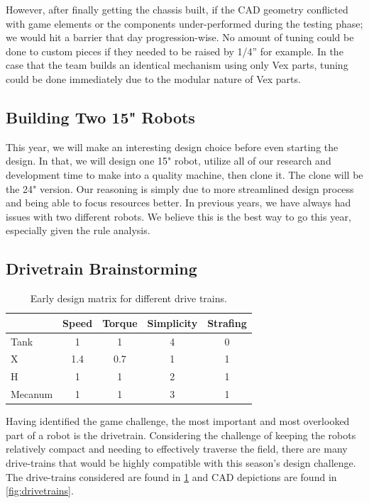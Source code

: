 However, after finally getting the chassis built, if the CAD geometry conflicted with game elements or the components under-performed during the testing phase; we would hit a barrier that day progression-wise. No amount of tuning could be done to custom pieces if they needed to be raised by 1/4” for example. In the case that the team builds an identical mechanism using only Vex parts, tuning could be done immediately due to the modular 
nature of Vex parts.

\subsection{Building Two 15" Robots}
This year, we will make an interesting design choice before even starting the design. In that, we will design one 15" robot, utilize all of our research and development time to make into a quality machine, then clone it. The clone will be the 24" version. Our reasoning is simply due to more streamlined design process and being able to focus resources better. In previous years, we have always had issues with two different robots. We believe this is the best way to go this year, especially given the rule analysis. 


\subsection{Drivetrain Brainstorming}

\begin{table}[h!]
    \centering
    \begin{tabular}{lcccc}
        \toprule
        & Speed  & Torque & Simplicity & Strafing \\
        \midrule
        Tank    & 1 & 1   & 4 & 0 \\
        X        & 1.4 & 0.7 & 1 & 1 \\
        H        & 1   & 1   & 2 & 1 \\
        Mecanum  & 1   & 1   & 3 & 1 \\
        \bottomrule
    \end{tabular}
    \caption{Early design matrix for different drive trains.}
    \label{tab:drive design matrix}
\end{table}

Having identified the game challenge, the most important and most overlooked part of a
robot is the drivetrain. Considering the challenge of keeping the robots relatively compact
and needing to effectively traverse the field, there are many drive-trains that
would be highly compatible with this season’s design challenge. The drive-trains considered are found in \ref{tab:drive design matrix} and CAD depictions are found in \ref{fig:drivetrains}.

